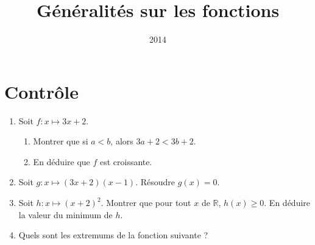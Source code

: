 \documentclass[14pt, aspectratio=43]{beamer}
\institute{Lycée Marie Curie}
\date{2014}
\title{Généralités sur les fonctions}
\begin{document}
\section{Contrôle}
\begin{frame}
\end{frame}

\begin{frame}
  \begin{enumerate}
    \item Soit $f:x\mapsto 3x+2$.
      \begin{enumerate}
        \item Montrer que si $a<b$, alors $3a+2<3b+2$.
        \item En déduire que $f$ est croissante.
      \end{enumerate}
    \item Soit $g:x\mapsto \left( 3x+2 \right)\left( x-1 \right)$. Résoudre $g(x)=0$.
    \item Soit $h:x\mapsto \left( x+2 \right)^2$. Montrer que pour tout $x$ de $\mathbb{R}$,  $h(x)\geq0$. En déduire la valeur du minimum de $h$.
    \item Quels sont les extremums de la fonction suivante ?
  \begin{center}
  \end{center}
  \end{enumerate}
\end{frame}
\end{document}

